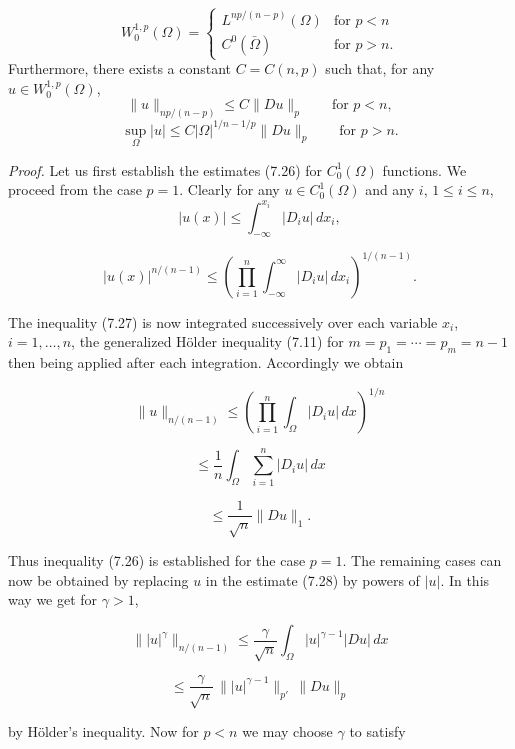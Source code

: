 \begin{theorem}\label{gt:thm-sobolev-embedding-basic}
\[
W^{1,p}_0(\Omega)=
\begin{cases}
L^{np/(n-p)}(\Omega) & \text{for } p<n \\
C^0(\bar{\Omega}) & \text{for } p>n.
\end{cases}
\]
Furthermore, there exists a constant $C=C(n,p)$ such that, for any $u\in W^{1,p}_0(\Omega)$,
\begin{equation}
\tag{7.26}
\|u\|_{np/(n-p)} \leq C\|Du\|_p \qquad \text{for } p<n,
\end{equation}
\[
\sup_{\Omega} |u| \leq C|\Omega|^{1/n-1/p}\|Du\|_p \qquad \text{for } p>n.
\]

\emph{Proof.} Let us first establish the estimates (7.26) for $C^1_0(\Omega)$ functions. We proceed from the case $p=1$. Clearly for any $u \in C^1_0(\Omega)$ and any $i$, $1 \leq i \leq n$,
\[
|u(x)| \leq \int_{-\infty}^{x_i} |D_i u|\, dx_i,
\]


\[
|u(x)|^{n/(n-1)} \le \left(\prod_{i=1}^n \int_{-\infty}^{\infty} |D_i u|\,dx_i\right)^{1/(n-1)} .
\]

The inequality (7.27) is now integrated successively over each variable $x_i$, $i=1,\ldots,n$, the generalized H\"older inequality (7.11) for $m=p_1=\cdots=p_m=n-1$ then being applied after each integration. Accordingly we obtain

\[
\|u\|_{n/(n-1)} \le \left(\prod_{i=1}^n \int_{\Omega} |D_i u|\,dx\right)^{1/n}
\]

\[
\le \frac{1}{n}\int_{\Omega}\sum_{i=1}^n |D_i u|\,dx
\]

\[
\le \frac{1}{\sqrt{n}}\|Du\|_1.
\]

Thus inequality (7.26) is established for the case $p=1$. The remaining cases can now be obtained by replacing $u$ in the estimate (7.28) by powers of $|u|$. In this way we get for $\gamma>1$,

\[
\||u|^\gamma\|_{n/(n-1)} \le \frac{\gamma}{\sqrt{n}} \int_{\Omega} |u|^{\gamma-1}|Du|\,dx
\]

\[
\le \frac{\gamma}{\sqrt{n}} \, \||u|^{\gamma-1}\|_{p'}\,\|Du\|_p
\]

by H\"older's inequality. Now for $p<n$ we may choose $\gamma$ to satisfy


\end{theorem}
